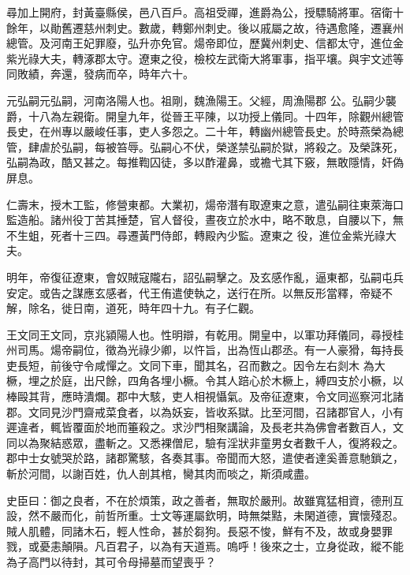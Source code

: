 \begin{pinyinscope}
 尋加上開府，封黃臺縣侯，邑八百戶。高祖受禪，進爵為公，授驃騎將軍。宿衛十餘年，以勛舊遷慈州刺史。數歲，轉鄭州刺史。後以戚屬之故，待遇愈隆，遷襄州總管。及河南王妃罪廢，弘升亦免官。煬帝即位，歷冀州刺史、信都太守，進位金紫光祿大夫，轉涿郡太守。遼東之役，檢校左武衛大將軍事，指平壤。與宇文述等同敗績，奔還，發病而卒，時年六十。



 元弘嗣元弘嗣，河南洛陽人也。祖剛，魏漁陽王。父經，周漁陽郡
 公。弘嗣少襲爵，十八為左親衛。開皇九年，從晉王平陳，以功授上儀同。十四年，除觀州總管長史，在州專以嚴峻任事，吏人多怨之。二十年，轉幽州總管長史。於時燕榮為總管，肆虐於弘嗣，每被笞辱。弘嗣心不伏，榮遂禁弘嗣於獄，將殺之。及榮誅死，弘嗣為政，酷又甚之。每推鞫囚徒，多以酢灌鼻，或襜弋其下竅，無敢隱情，奸偽屏息。



 仁壽末，授木工監，修營東都。大業初，煬帝潛有取遼東之意，遣弘嗣往東萊海口監造船。諸州役丁苦其捶楚，官人督役，晝夜立於水中，略不敢息，自腰以下，無不生蛆，死者十三四。尋遷黃門侍郎，轉殿內少監。遼東之
 役，進位金紫光祿大夫。



 明年，帝復征遼東，會奴賊寇隴右，詔弘嗣擊之。及玄感作亂，逼東都，弘嗣屯兵安定。或告之謀應玄感者，代王侑遣使執之，送行在所。以無反形當釋，帝疑不解，除名，徙日南，道死，時年四十九。有子仁觀。



 王文同王文同，京兆潁陽人也。性明辯，有乾用。開皇中，以軍功拜儀同，尋授桂州司馬。煬帝嗣位，徵為光祿少卿，以忤旨，出為恆山郡丞。有一人豪猾，每持長吏長短，前後守令咸憚之。文同下車，聞其名，召而數之。因令左右剡木
 為大橛，埋之於庭，出尺餘，四角各埋小橛。令其人踣心於木橛上，縛四支於小橛，以棒毆其背，應時潰爛。郡中大駭，吏人相視懾氣。及帝征遼東，令文同巡察河北諸郡。文同見沙門齋戒菜食者，以為妖妄，皆收系獄。比至河間，召諸郡官人，小有遲違者，輒皆覆面於地而箠殺之。求沙門相聚講論，及長老共為佛會者數百人，文同以為聚結惑眾，盡斬之。又悉裸僧尼，驗有淫狀非童男女者數千人，復將殺之。郡中士女號哭於路，諸郡驚駭，各奏其事。帝聞而大怒，遣使者達奚善意馳鎖之，斬於河間，以謝百姓，仇人剖其棺，臠其肉而啖之，斯須咸盡。



 史臣曰：御之良者，不在於煩策，政之善者，無取於嚴刑。故雖寬猛相資，德刑互設，然不嚴而化，前哲所重。士文等運屬欽明，時無桀黠，未閑道德，實懷殘忍。賊人肌體，同諸木石，輕人性命，甚於芻狗。長惡不悛，鮮有不及，故或身嬰罪戮，或憂恚顛隕。凡百君子，以為有天道焉。嗚呼！後來之士，立身從政，縱不能為子高門以待封，其可令母掃墓而望喪乎？



\end{pinyinscope}